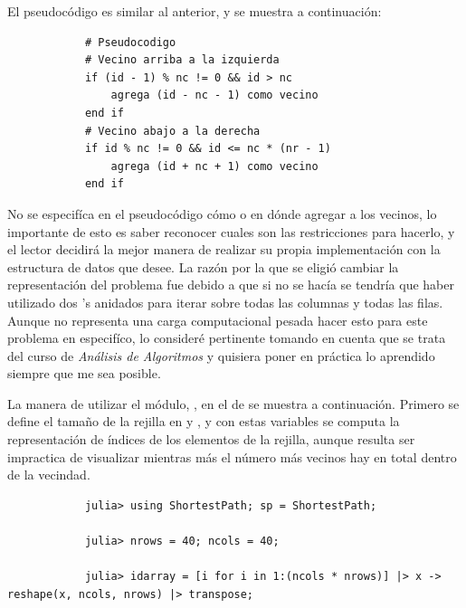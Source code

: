 \begin{enumerate}
\begin{solution}
        El pseudocódigo es similar al anterior, y se muestra a continuación:
        \begin{verbatim}
            # Pseudocodigo
            # Vecino arriba a la izquierda
            if (id - 1) % nc != 0 && id > nc
                agrega (id - nc - 1) como vecino
            end if
            # Vecino abajo a la derecha
            if id % nc != 0 && id <= nc * (nr - 1)
                agrega (id + nc + 1) como vecino
            end if
        \end{verbatim}
        No se especifíca en el pseudocódigo cómo o en dónde agregar a los vecinos, lo importante de esto es saber reconocer cuales son las restricciones para hacerlo, y el lector decidirá la mejor manera de realizar su propia implementación con la estructura de datos que desee. La razón por la que se eligió cambiar la representación del problema fue debido a que si no se hacía se tendría que haber utilizado dos 's anidados para iterar sobre todas las columnas y todas las filas. Aunque no representa una carga computacional pesada hacer esto para este problema en especifíco, lo consideré pertinente tomando en cuenta que se trata del curso de \textit{Análisis de Algoritmos} y quisiera poner en práctica lo aprendido siempre que me sea posible.

        La manera de utilizar el módulo, , en el  de  se muestra a continuación. Primero se define el tamaño de la rejilla en  y , y con estas variables se computa la representación de índices de los elementos de la rejilla, aunque resulta ser impractica de visualizar mientras más el número más vecinos hay en total dentro de la vecindad.
        \begin{verbatim}
            julia> using ShortestPath; sp = ShortestPath;

            julia> nrows = 40; ncols = 40;

            julia> idarray = [i for i in 1:(ncols * nrows)] |> x -> reshape(x, ncols, nrows) |> transpose;


\end{verbatim}
\end{solution}
\end{enumerate}
